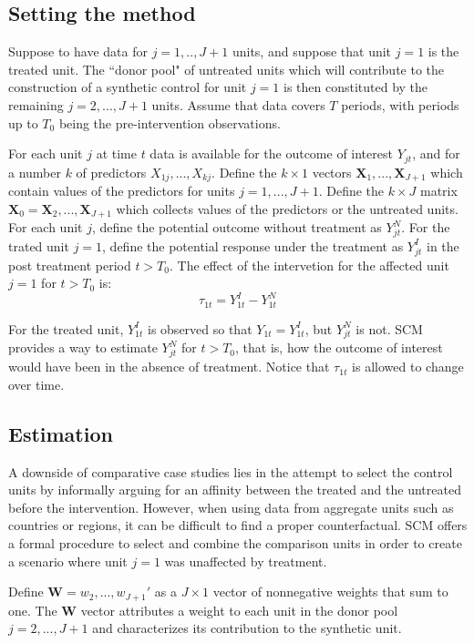 \documentclass[12pt,a4paper,draft]{article}
\begin{document}
\subsection{Setting the method}
Suppose to have data for $j=1,..,J+1$ units, and suppose that unit $j=1$ is the 
treated unit. The ``donor pool" of untreated units which will contribute to the 
construction of a synthetic control for unit $j=1$ is then constituted by the 
remaining $j=2,...,J+1$ units.
Assume that data covers $T$ periods, with periods up to $T_0$ being the 
pre-intervention observations.

For each unit $j$ at time $t$ data is available for the outcome of interest 
$Y_{jt}$, and for a number $k$ of predictors $X_{1j}, ..., X_{kj}$. Define the 
$k \times 1$ vectors $\mathbf{X}_1, ..., \mathbf{X}_{J+1}$ which contain values
of the predictors for units $j=1,...,J+1$. Define the $k \times J$ matrix 
$\mathbf{X}_0={\mathbf{X}_2,..., \mathbf{X}_{J+1}}$ which collects values of the predictors 
or the untreated units.
For each unit $j$, define the potential outcome without treatment as $Y_{jt}^N$.
For the trated unit $j=1$, define the potential response under the treatment as 
$Y_{jt}^I$ in the post treatment period $t>T_0$. The effect of the intervetion 
for the affected unit $j=1$ for $t>T_0$ is: 
$$\tau_{1t}=Y_{1t}^I-Y_{1t}^N$$

For the treated unit, $Y_{1t}^I$ is observed so that  $Y_{1t}=Y_{1t}^I$, but $Y_{jt}^N$ is not. 
SCM provides a way to estimate $Y_{jt}^N$ for $t>T_0$, that is, how the outcome 
of interest would have been in the absence of treatment. Notice that $\tau_{1t}$
is allowed to change over time.

\subsection{Estimation}
A downside of comparative case studies lies in the attempt to select the control 
units by informally arguing for an affinity between the treated and the untreated 
before the intervention. However, when using data from aggregate units such as 
countries or regions, it can be difficult to find a proper counterfactual.
SCM offers a formal procedure to select and combine the comparison units in order
to create a scenario where unit $j=1$ was unaffected by treatment.

Define $\mathbf{W}=w_2,...,w_{J+1}'$ as a $J\times 1$ vector of nonnegative weights
that sum to one. 
The $\mathbf{W}$ vector attributes a weight to each unit in the donor pool 
$j=2,...,J+1$ and characterizes its contribution to the synthetic unit. 
\end{document}
